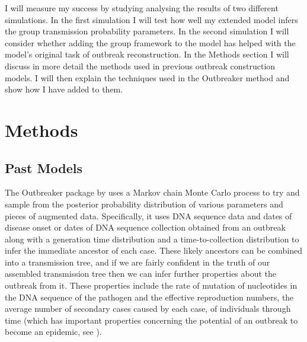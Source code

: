 \documentclass[11pt,a4paper]{report}
\begin{document}
I will measure my success by studying analysing the results of two different simulations. In the first simulation I will test how well my extended model infers the group transmission probability parameters. In the second simulation I will consider whether adding the group framework to the model has helped with the model's original task of outbreak reconstruction. In the Methods section I will discuss in more detail the methods used in previous outbreak construction models. I will then explain the techniques used in the Outbreaker method and show how I have added to them. 

\chapter{Methods}

\section{Past Models}
The Outbreaker package by \citet{outbrkr} uses a Markov chain Monte Carlo process to try and sample from the posterior probability distribution of various parameters and pieces of augmented data. Specifically, it uses DNA sequence data and dates of disease onset or dates of DNA sequence collection obtained from an outbreak along with a generation time distribution and a time-to-collection distribution to infer the immediate ancestor of each case. These likely ancestors can be combined into a transmission tree, and if we are fairly confident in the truth of our assembled transmission tree then we can infer further properties about the outbreak from it. These properties include the rate of mutation of nucleotides in the DNA sequence of the pathogen and the effective reproduction numbers, the average number of secondary cases caused by each case, of individuals through time (which has important properties concerning the potential of an outbreak to become an epidemic, see \citet{Grassly08}).
\end{document}
